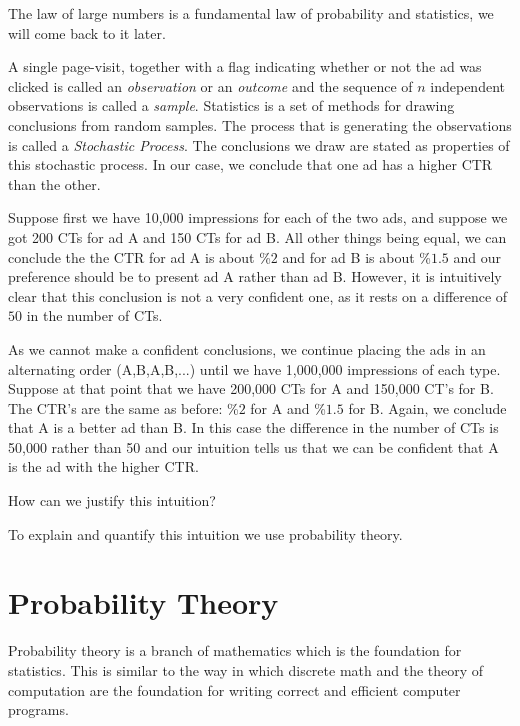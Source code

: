 The law of large numbers is a fundamental law of probability and
statistics, we will come back to it later.

A single page-visit, together with a flag indicating whether or not
the ad was clicked is called an {\em observation} or an {\em outcome}
and the sequence of $n$ independent observations is called a {\em
  sample}. Statistics is a set of methods for drawing conclusions from
random samples. The process that is generating the observations is
called a {\em Stochastic Process}. The conclusions we draw are stated
as properties of this stochastic process. In our case, we conclude
that one ad has a higher CTR than the other.

Suppose first we have 10,000 impressions for each of the two ads, and
suppose we got 200 CTs for ad A and 150 CTs for ad B. All other things
being equal, we can conclude the the CTR for ad A is about \%$2$ and for
ad B is about \%$1.5$ and our preference should be to present
ad A rather than ad B. However, it is intuitively clear that this
conclusion is not a very confident one, as it rests on a difference of
$50$ in the number of CTs.

As we cannot make a confident conclusions, we continue placing the ads
in an alternating order (A,B,A,B,...) until we have 1,000,000
impressions of each type. Suppose at that point that we have 200,000
CTs for A and 150,000 CT's for B. The CTR's are the same as before:
\%$2$ for A and  \%$1.5$  for B. Again, we conclude that A is a
better ad than B. In this case the difference in
the number of CTs is 50,000 rather than 50 and our intuition tells us
that we can be confident that A is the ad with the higher CTR.

How can we justify this intuition?

To explain and quantify this intuition we use probability theory.

\section{Probability Theory}

Probability theory is a branch of mathematics which is the foundation
for statistics. This is similar to the way in which discrete math and
the theory of computation are the foundation for writing correct and
efficient computer programs.


